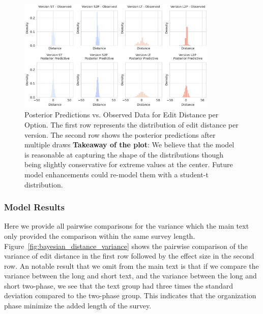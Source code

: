 \begin{figure}[p]
    \centering
    \includegraphics[width=0.85\textwidth]{content/image/distance/observed_vs_posterior_predictive_histogram_m2.pdf}
    \caption{Posterior Predictions vs. Observed Data for Edit Distance per Option. The first row represents the distribution of edit distance per version. The second row shows the posterior predictions after multiple draws \textbf{Takeaway of the plot}: We believe that the model is reasonable at capturing the shape of the distributions though being slightly conservative for extreme values at the center. Future model enhancements could re-model them with a student-t distribution.}

    \label{fig:observed_vs_posterior_predictive_histogram_m2}
\end{figure}

\subsubsection{Model Results}
Here we provide all pairwise comparisons for the variance which the main text only provided the comparison within the same survey length. Figure~\ref{fig:bayesian_distance_variance} shows the pairwise comparison of the variance of edit distance in the first row followed by the effect size in the second row. An notable result that we omit from the main text is that if we compare the variance between the long and short text, and the variance between the long and short two-phase, we see that the text group had three times the standard deviation compared to the two-phase group. This indicates that the organization phase minimize the added length of the survey.

